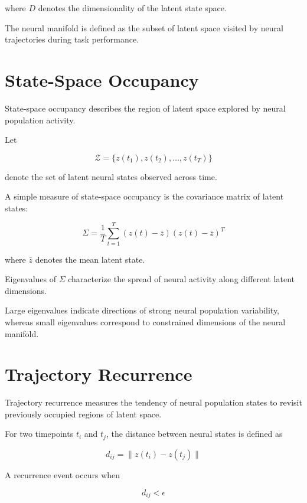 \documentclass[11pt]{report}
\begin{document}
where $D$ denotes the dimensionality of the latent state space.

The neural manifold is defined as the subset of latent space visited
by neural trajectories during task performance.

\section{State-Space Occupancy}

State-space occupancy describes the region of latent space explored
by neural population activity.

Let

\begin{equation}
\mathcal{Z} = \{ z(t_1), z(t_2), \dots, z(t_T) \}
\end{equation}

denote the set of latent neural states observed across time.

A simple measure of state-space occupancy is the covariance matrix
of latent states:

\begin{equation}
\Sigma =
\frac{1}{T}
\sum_{t=1}^{T}
(z(t) - \bar{z})
(z(t) - \bar{z})^T
\end{equation}

where $\bar{z}$ denotes the mean latent state.

Eigenvalues of $\Sigma$ characterize the spread of neural activity
along different latent dimensions.

Large eigenvalues indicate directions of strong neural population
variability, whereas small eigenvalues correspond to constrained
dimensions of the neural manifold.

\section{Trajectory Recurrence}

Trajectory recurrence measures the tendency of neural population
states to revisit previously occupied regions of latent space.

For two timepoints $t_i$ and $t_j$, the distance between neural
states is defined as

\begin{equation}
d_{ij} =
\| z(t_i) - z(t_j) \|
\end{equation}

A recurrence event occurs when

\begin{equation}
d_{ij} < \epsilon
\end{equation}
\end{document}

